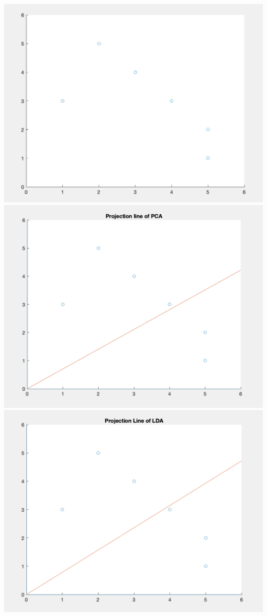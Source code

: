 \documentclass[11pt]{article}
\begin{document}
\includegraphics[scale=.6]{plot}\\
\includegraphics[scale=.6]{pca}\\
\includegraphics[scale=.6]{lda}
\end{document}

